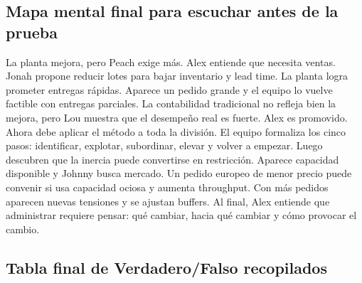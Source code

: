 \documentclass[
  11pt,
]{article}
\begin{document}
\hypertarget{mapa-mental-final-para-escuchar-antes-de-la-prueba}{%
\subsection{Mapa mental final para escuchar antes de la
prueba}\label{mapa-mental-final-para-escuchar-antes-de-la-prueba}}

La planta mejora, pero Peach exige más. Alex entiende que necesita
ventas. Jonah propone reducir lotes para bajar inventario y lead time.
La planta logra prometer entregas rápidas. Aparece un pedido grande y el
equipo lo vuelve factible con entregas parciales. La contabilidad
tradicional no refleja bien la mejora, pero Lou muestra que el desempeño
real es fuerte. Alex es promovido. Ahora debe aplicar el método a toda
la división. El equipo formaliza los cinco pasos: identificar, explotar,
subordinar, elevar y volver a empezar. Luego descubren que la inercia
puede convertirse en restricción. Aparece capacidad disponible y Johnny
busca mercado. Un pedido europeo de menor precio puede convenir si usa
capacidad ociosa y aumenta throughput. Con más pedidos aparecen nuevas
tensiones y se ajustan buffers. Al final, Alex entiende que administrar
requiere pensar: qué cambiar, hacia qué cambiar y cómo provocar el
cambio.

\hypertarget{tabla-final-de-verdaderofalso-recopilados}{%
\subsection{Tabla final de Verdadero/Falso
recopilados}\label{tabla-final-de-verdaderofalso-recopilados}}
\end{document}
